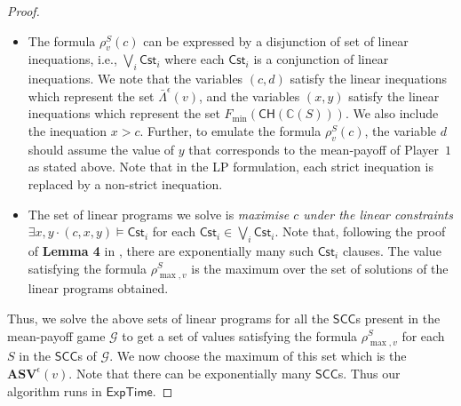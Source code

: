 \begin{proof}
\begin{enumerate}
\begin{itemize}
      \item The 
      formula $\rho^S_{v}(c)$ can be expressed by a disjunction of set of linear inequations, i.e., $\bigvee_i \mathsf{Cst}_i$ where each $\mathsf{Cst}_i$ is a conjunction of linear inequations. We note that the variables $(c, d)$ satisfy the linear inequations which represent the set $\bar{\Lambda}^{\epsilon}(v)$, and the variables $(x, y)$ satisfy the linear inequations which represent the set $F_{\min}(\mathsf{CH}(\mathbb{C}(S)))$. We also include the inequation $x > c$.
      Further, to emulate the formula $\rho^S_{v}(c)$, the variable $d$ should assume the value of $y$ that corresponds to the mean-payoff of Player~$1$ as stated above.
      Note that in the LP formulation, each strict inequation is replaced by a non-strict inequation.
      
      \item The set of linear programs we solve is \textit{maximise $c$ under the linear constraints $\exists x, y \cdot (c,x,y) \models \mathsf{Cst}_i$} for each $\mathsf{Cst}_i \in \bigvee_i \mathsf{Cst}_i$. Note that, following the proof of \textbf{Lemma 4} in \cite{BR15}, there are exponentially many such $\mathsf{Cst}_i$ clauses. The value satisfying the formula $\rho^S_{\max,v}$ is the maximum over the set of solutions of the linear programs obtained.
\end{itemize}
\end{enumerate}

Thus, we solve the above sets of linear programs for all the $\mathsf{SCC}$s present in the mean-payoff game $\mathcal{G}$ to get a set of values satisfying the formula $\rho^S_{\max,v}$ for each $S$ in the $\mathsf{SCC}$s of $\mathcal{G}$. We now choose the maximum of this set
which is the $\mathbf{ASV}^{\epsilon}(v)$. Note that 
there can be exponentially many $\mathsf{SCC}$s.
Thus our algorithm runs in $\mathsf{ExpTime}$.
\end{proof}
